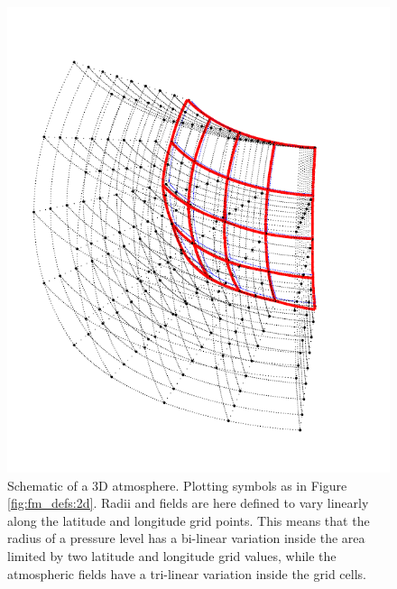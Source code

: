 \begin{figure}[p]
 \begin{center}
  \includegraphics*[angle=-90,width=0.98\hsize]{atm_dim_3d}
  \vspace*{-15mm}
  \caption{Schematic of a 3D atmosphere. Plotting symbols as in 
    Figure \ref{fig:fm_defs:2d}. Radii and fields are here defined to
    vary linearly along the latitude and longitude grid points. This
    means that the radius of a pressure level has a
    bi-linear variation inside the area limited by two latitude and
    longitude grid values, while the atmospheric fields have a
    tri-linear variation inside the grid cells. }
  \label{fig:fm_defs:3d}
 \end{center}
\end{figure}

